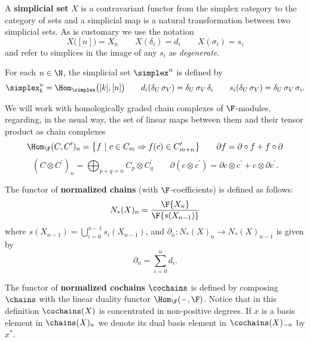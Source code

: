 A \textbf{simplicial set} $X$ is a contravariant functor from the simplex category to the category of sets and a simplicial map is a natural transformation between two simplicial sets. As is customary we use the notation
\begin{equation*}
X\big( [n] \big) = X_n \qquad X(\delta_i) = d_i \qquad X(\sigma_i) = s_i
\end{equation*}
and refer to simplices in the image of any $s_i$ as \textit{degenerate}.

For each $n \in \N$, the simplicial set $\simplex^n$ is defined by
\begin{equation*}
\simplex^n_k  = \Hom_{\simplex} \big( [k], [n] \big) \qquad
d_i(\delta_U\, \sigma_V) = \delta_U\, \sigma_V \, \delta_i \qquad
s_i(\delta_U\, \sigma_V) = \delta_U\, \sigma_V \, \sigma_i.
\end{equation*}

We will work with homologically graded chain complexes of $\F$-modules, regarding, in the usual way, the set of linear maps between them and their tensor product as chain complexes
\begin{equation*}
\Hom_{\F}(C, C')_n = \big\{f \ |\ c\in C_m \Rightarrow f(c) \in C'_{m+n} \big\}
\qquad
\partial f = \partial \circ f + f \circ \partial
\end{equation*}
\begin{equation*}
(C \otimes C^\prime)_n = \bigoplus_{p + q = n} C_p \otimes C^\prime_q \qquad \partial (c \otimes c^\prime) = \partial c \otimes c^\prime + c \otimes \partial c^\prime.
\end{equation*}

The functor of \textbf{normalized chains} (with $\F$-coefficients) is defined as follows:
\begin{equation*}
N_*(X)_n = \frac{\F \{ X_n \}}{\F \{ s(X_{n-1}) \}}
\end{equation*}
where $s(X_{n-1}) = \bigcup_{i=0}^{n-1} s_i(X_{n-1})$, and $\partial_n : N_*(X)_n \to N_*(X)_{n-1}$ is given by
\begin{equation*}
\partial_n = \sum_{i = 0}^{n} d_{i}.
\end{equation*}

The functor of \textbf{normalized cochains} $\cochains$ is defined by composing $\chains$ with the linear duality functor $\Hom_{\F}(-, \F)$. Notice that in this definition $\cochains(X)$ is concentrated in non-positive degrees. If $x$ is a basis element in $\chains(X)_n$ we denote its dual basis element in $\cochains(X)_{-n}$ by $x^*$.